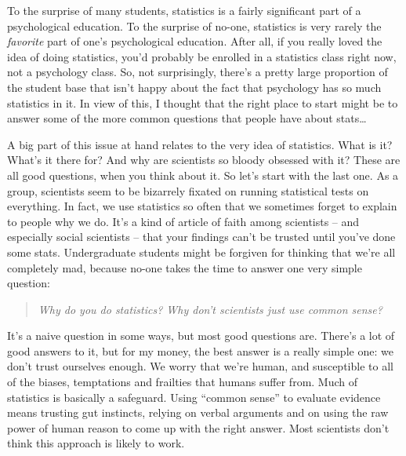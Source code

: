 \documentclass[]{book}
\begin{document}
To the surprise of many students, statistics is a fairly significant part of a psychological education. To the surprise of no-one, statistics is very rarely the \emph{favorite} part of one's psychological education. After all, if you really loved the idea of doing statistics, you'd probably be enrolled in a statistics class right now, not a psychology class. So, not surprisingly, there's a pretty large proportion of the student base that isn't happy about the fact that psychology has so much statistics in it. In view of this, I thought that the right place to start might be to answer some of the more common questions that people have about stats\ldots{}

A big part of this issue at hand relates to the very idea of statistics. What is it? What's it there for? And why are scientists so bloody obsessed with it? These are all good questions, when you think about it. So let's start with the last one. As a group, scientists seem to be bizarrely fixated on running statistical tests on everything. In fact, we use statistics so often that we sometimes forget to explain to people why we do. It's a kind of article of faith among scientists -- and especially social scientists -- that your findings can't be trusted until you've done some stats. Undergraduate students might be forgiven for thinking that we're all completely mad, because no-one takes the time to answer one very simple question:

\begin{quote}
\emph{Why do you do statistics? Why don't scientists just use common sense?}
\end{quote}

It's a naive question in some ways, but most good questions are. There's a lot of good answers to it, but for my money, the best answer is a really simple one: we don't trust ourselves enough. We worry that we're human, and susceptible to all of the biases, temptations and frailties that humans suffer from. Much of statistics is basically a safeguard. Using ``common sense'' to evaluate evidence means trusting gut instincts, relying on verbal arguments and on using the raw power of human reason to come up with the right answer. Most scientists don't think this approach is likely to work.
\end{document}
